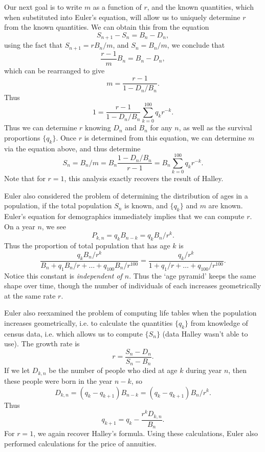 Our next goal is to write $m$ as a function of $r$, and the known quantities, which when substituted into Euler's equation, will allow us to uniquely determine $r$ from the known quantities. We can obtain this from the equation
%
\[ S_{n+1} - S_n = B_n - D_n, \]
%
using the fact that $S_{n+1} = r B_n / m$, and $S_n = B_n / m$, we conclude that
%
\[ \frac{r - 1}{m} B_n = B_n - D_n, \]
%
which can be rearranged to give
%
\[ m = \frac{r-1}{1 - D_n / B_n}. \]
%
Thus
%
\[ 1 = \frac{r-1}{1 - D_n / B_n} \sum_{k = 0}^{100} q_k r^{-k}. \]
%
Thus we can determine $r$ knowing $D_n$ and $B_n$ for any $n$, as well as the survival proportions $\{ q_k \}$. Once $r$ is determined from this equation, we can determine $m$ via the equation above, and thus determine
%
\[ S_n = B_n / m = B_n \frac{1 - D_n / B_n}{r - 1} = B_n \sum_{k = 0}^{100} q_k r^{-k}. \]
%
Note that for $r = 1$, this analysis exactly recovers the result of Halley.

Euler also considered the problem of determining the distribution of ages in a population, if the total population $S_n$ is known, and $\{ q_k \}$ and $m$ are known. Euler's equation for demographics immediately implies that we can compute $r$. On a year $n$, we see
%
\[ P_{k,n} = q_k B_{n-k} = q_k B_n / r^k. \]
%
Thus the proportion of total population that has age $k$ is
%
\[ \frac{q_k B_n / r^k}{B_n + q_1 B_n / r + \dots + q_{100} B_n / r^{100}} = \frac{q_k / r^k}{1 + q_1 / r + \dots + q_{100} / r^{100}}. \]
%
Notice this constant is \emph{independent of $n$}. Thus the `age pyramid' keeps the same shape over time, though the number of individuals of each increases geometrically at the same rate $r$.

Euler also reexamined the problem of computing life tables when the population increases geometrically, i.e. to calculate the quantities $\{ q_k \}$ from knowledge of census data, i.e. which allows us to compute $\{ S_n \}$ (data Halley wasn't able to use). The growth rate is
%
\[ r = \frac{S_n - D_n}{S_n - B_n}. \]
%
If we let $D_{k,n}$ be the number of people who died at age $k$ during year $n$, then these people were born in the year $n-k$, so
%
\[ D_{k,n} = (q_k - q_{k+1}) B_{n-k} = (q_k - q_{k+1}) B_n / r^k. \]
%
Thus
%
\[ q_{k+1} = q_k - \frac{r^k D_{k,n}}{B_n}. \]
%
For $r = 1$, we again recover Halley's formula. Using these calculations, Euler also performed calculations for the price of annuities.

